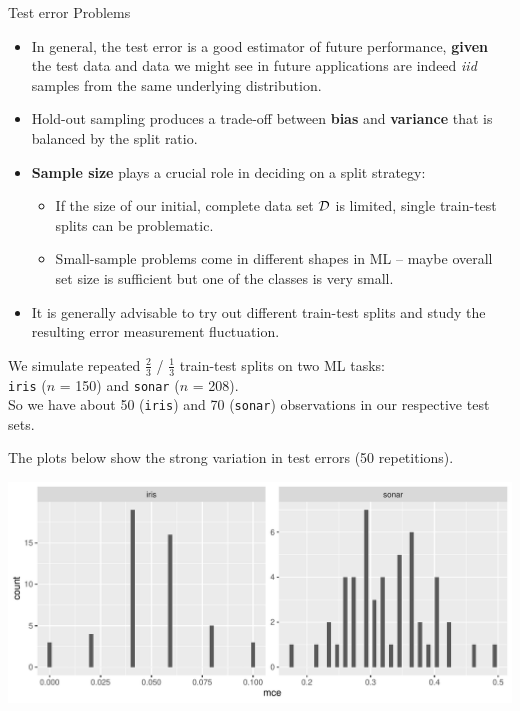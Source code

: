 \begin{vbframe}{Test error Problems}

\begin{itemize}
  \item In general, the test error is a good estimator of future performance,
  \textbf{given} the test data and data we might see in future applications are 
  indeed \textit{iid} samples from the same underlying distribution.
  \item Hold-out sampling produces a trade-off between \textbf{bias} and
  \textbf{variance} that is balanced by the split ratio.
  \item \textbf{Sample size} plays a crucial role in deciding on a split 
  strategy:
  \begin{itemize}
    \item If the size of our initial, complete data set $\mathcal{D}$ is limited,
    single train-test splits can be problematic.
    \item Small-sample problems come in different shapes in ML -- 
    maybe overall set size is sufficient but one of the classes is very small.
  \end{itemize}
  \item It is generally advisable to try out different train-test splits and 
  study the resulting error measurement fluctuation.
\end{itemize}

\framebreak

We simulate repeated $\tfrac{2}{3}$ / $\tfrac{1}{3}$ train-test splits on two ML 
tasks:\\ 
\texttt{iris} ($n$ = 150) and \texttt{sonar} ($n$ = 208).\\
So we have about 50 (\texttt{iris}) and 70 (\texttt{sonar}) observations in our 
respective test sets.\\

\vfill

The plots below show the strong variation in test errors (50 
repetitions).

\vfill

\includegraphics[width=\textwidth]{figure/test-error-flucuation} 

\end{vbframe}

